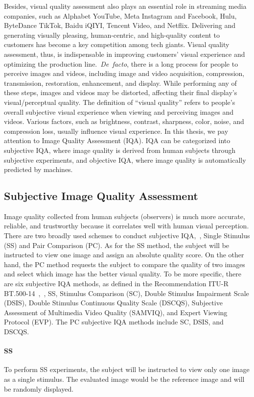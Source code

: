 	Besides, visual quality assessment also plays an essential role in streaming media companies, such as Alphabet YouTube, Meta Instagram and Facebook, Hulu, ByteDance TikTok, Baidu iQIYI, Tencent Video, and Netflix. Delivering and generating visually pleasing, human-centric, and high-quality content to customers has become a key competition among tech giants. Visual quality assessment, thus, is indispensable in improving customers' visual experience and optimizing the production line.~\textit{De~facto}, there is a long process for people to perceive images and videos, including image and video acquisition, compression, transmission, restoration, enhancement, and display. While performing any of these steps, images and videos may be distorted, affecting their final display's visual/perceptual quality. The definition of ``visual quality'' refers to people's overall subjective visual experience when viewing and perceiving images and videos. Various factors, such as brightness, contrast, sharpness, color, noise, and compression loss, usually influence visual experience. In this thesis, we pay attention to Image Quality Assessment (IQA). IQA can be categorized into subjective IQA, where image quality is derived from human subjects through subjective experiments, and objective IQA, where image quality is automatically predicted by machines.
	
	\subsection{Subjective Image Quality Assessment}
	Image quality collected from human subjects (observers) is much more accurate, reliable, and trustworthy because it correlates well with human visual perception. There are two broadly used schemes to conduct subjective IQA,~\ie, Single Stimulus (SS) and Pair Comparison (PC). As for the SS method, the subject will be instructed to view one image and assign an absolute quality score. On the other hand, the PC method requests the subject to compare the quality of two images and select which image has the better visual quality. To be more specific, there are six subjective IQA methods, as defined in the Recommendation ITU-R BT.500-14~\citep{bt2020methodologies},~\ie, SS, Stimulus Comparison (SC), Double Stimulus Impairment Scale (DSIS), Double Stimulus Continuous Quality Scale (DSCQS), Subjective Assessment of Multimedia Video Quality (SAMVIQ), and Expert Viewing Protocol (EVP). The PC subjective IQA methods include SC, DSIS, and DSCQS.
	
	\paragraph{SS} To perform SS experiments, the subject will be instructed to view only one image as a single stimulus. The evaluated image would be the reference image and will be randomly displayed.
	
